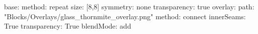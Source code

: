 base:
  method: repeat
  size: [8,8]
  symmetry: none
  transparency: true
overlay:
  path: "Blocks/Overlays/glass_thornmite_overlay.png"
  method: connect
  innerSeams: True
  transparency: True
blendMode: add